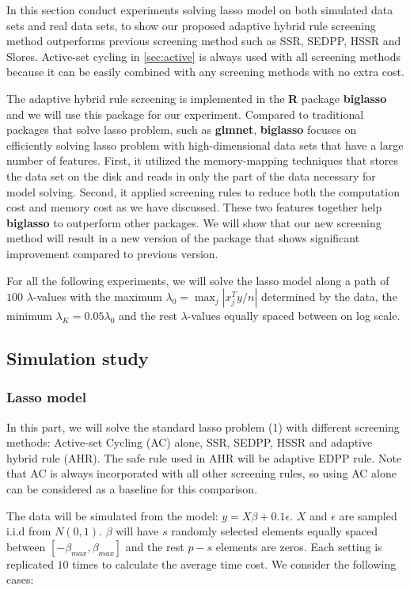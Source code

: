 In this section conduct experiments solving lasso model on both simulated data sets and real data sets, to show our proposed adaptive hybrid rule screening method outperforms previous screening method such as SSR, SEDPP, HSSR and Slores. Active-set cycling in \ref{sec:active} is always used with all screening methods because it can be easily combined with any screening methods with no extra cost.

The adaptive hybrid rule screening is implemented in the \textbf{R} package \textbf{biglasso} and we will use this package for our experiment. Compared to traditional packages that solve lasso problem, such as \textbf{glmnet}, \textbf{biglasso} focuses on efficiently solving lasso problem with high-dimensional data sets that have a large number of features. First, it utilized the memory-mapping techniques that stores the data set on the disk and reads in only the part of the data necessary for model solving. Second, it applied screening rules to reduce both the computation cost and memory cost as we have discussed. These two features together help \textbf{biglasso} to outperform other packages. We will show that our new screening method will result in a new version of the package that shows significant improvement compared to previous version. 

For all the following experiments, we will solve the lasso model along a path of $100$ $\lambda$-values with the maximum $\lambda_0=\max_j|x_j^Ty/n|$ determined by the data, the minimum $\lambda_K=0.05\lambda_0$ and the rest $\lambda$-values equally spaced between on log scale.

\subsection{Simulation study}
\label{sec:sim}

\subsubsection{Lasso model}

In this part, we will solve the standard lasso problem (1) with different screening methods: Active-set Cycling (AC) alone, SSR, SEDPP, HSSR and adaptive hybrid rule (AHR). The safe rule used in AHR will be adaptive EDPP rule. Note that AC is always incorporated with all other screening rules, so using AC alone can be considered as a baseline for this comparison.

The data will be simulated from the model: $y=X\beta+0.1\epsilon$. $X$ and $\epsilon$ are sampled i.i.d from $N(0,1)$. $\beta$ will have $s$ randomly selected elements equally spaced between $[-\beta_{max},\beta_{max}]$ and the rest $p-s$ elements are zeros. Each setting is replicated $10$ times to calculate the average time cost. We consider the following cases:

